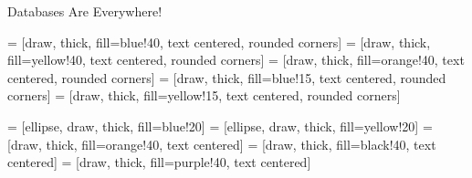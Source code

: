 \begin{frame}[t]{Databases Are Everywhere!}

  \hspace*{-.5in}
  \begin{minipage}{5in}
  \begin{center}

    \begin{minipage}{4.5in}

     = [draw, thick, fill=blue!40, text centered, rounded corners]
     = [draw, thick, fill=yellow!40, text centered, rounded corners]
     = [draw, thick, fill=orange!40, text centered, rounded corners]
     = [draw, thick, fill=blue!15, text centered, rounded corners]
     = [draw, thick, fill=yellow!15, text centered, rounded corners]

     = [ellipse, draw, thick, fill=blue!20]
     = [ellipse, draw, thick, fill=yellow!20]
     = [draw, thick, fill=orange!40, text centered]  
     = [draw, thick, fill=black!40, text centered]
     = [draw, thick, fill=purple!40, text centered]    


    

    



    \begin{figure}

    \begin{center}

\end{center}
\end{figure}
\end{minipage}
\end{center}
\end{minipage}
\end{frame}
